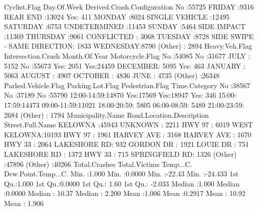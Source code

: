 \documentclass[11pt, a4paper]{article}
\begin{document}
\begin{Schunk}
\begin{Soutput}
 Cyclist.Flag    Day.Of.Week                Derived.Crash.Configuration
 No :55725    FRIDAY   :9316   REAR END                   :13024       
 Yes:  411    MONDAY   :8024   SINGLE VEHICLE             :12495       
              SATURDAY :6753   UNDETERMINED               :11453       
              SUNDAY   :5464   SIDE IMPACT                :11369       
              THURSDAY :9061   CONFLICTED                 : 3068       
              TUESDAY  :8728   SIDE SWIPE - SAME DIRECTION: 1833       
              WEDNESDAY:8790   (Other)                    : 2894       
 Heavy.Veh.Flag Intersection.Crash  Month.Of.Year   Motorcycle.Flag
 No :54085      No :31677          JULY    : 5152   No :55673      
 Yes: 2051      Yes:24459          DECEMBER: 5095   Yes:  463      
                                   JANUARY : 5063                  
                                   AUGUST  : 4907                  
                                   OCTOBER : 4836                  
                                   JUNE    : 4735                  
                                   (Other) :26348                  
 Parked.Vehicle.Flag Parking.Lot.Flag Pedestrian.Flag     Time.Category  
 No :38567           No :37189        No :55790       12:00-14:59:14870  
 Yes:17569           Yes:18947        Yes:  346       15:00-17:59:14473  
                                                      09:00-11:59:11021  
                                                      18:00-20:59: 5805  
                                                      06:00-08:59: 5489  
                                                      21:00-23:59: 2684  
                                                      (Other)    : 1794  
    Municipality.Name Road.Location.Description       Street.Full.Name
 KELOWNA     :45943   UNKNOWN     : 2211        HWY 97        : 6019  
 WEST KELOWNA:10193   HWY 97      : 1961        HARVEY AVE    : 3168  
                      HARVEY AVE  : 1670        HWY 33        : 2064  
                      LAKESHORE RD:  932        GORDON DR     : 1921  
                      LOUIE DR    :  751        LAKESHORE RD  : 1372  
                      HWY 33      :  715        SPRINGFIELD RD: 1326  
                      (Other)     :47896        (Other)       :40266  
 Total.Crashes   Total.Victims      Temp...C.      Dew.Point.Temp...C.
 Min.   :1.000   Min.   :0.0000   Min.   :-22.43   Min.   :-24.433    
 1st Qu.:1.000   1st Qu.:0.0000   1st Qu.:  1.60   1st Qu.: -2.033    
 Median :1.000   Median :0.0000   Median : 10.37   Median :  2.200    
 Mean   :1.006   Mean   :0.2917   Mean   : 10.92   Mean   :  1.906    

\end{Soutput}
\end{Schunk}
\end{document}
